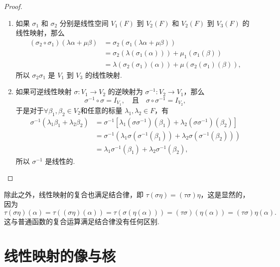 \begin{proof}
\begin{enumerate}
    \item 如果 $\sigma_1$ 和 $\sigma_2$ 分别是线性空间 $V_1(F)$ 到 $V_2(F)$ 和 $V_2(F)$ 到 $V_3(F)$ 的线性映射，那么
    \begin{align*}
        (\sigma_2 \circ \sigma_1)(\lambda \alpha  + \mu \beta) & = \sigma_2(\sigma_1(\lambda \alpha  + \mu \beta)) \\
        & = \sigma_2(\lambda (\sigma_1(\alpha))) + \mu_1(\sigma_1(\beta)) \\
        & = \lambda (\sigma_2(\sigma_1)(\alpha)) + \mu (\sigma_2(\sigma_1)(\beta)),
    \end{align*}
    所以 $\sigma_2\sigma_1$ 是 $V_1$ 到 $V_3$ 的线性映射.

    \item 如果可逆线性映射 $\sigma: V_1 \to V_2$ 的逆映射为 $\sigma^{-1}: V_2 \to V_1$，那么
    \[
    \sigma^{-1} \circ \sigma = I_{V_1}, \quad \text{且} \quad \sigma \circ \sigma^{-1} = I_{V_2},
    \]
    于是对于$ \forall \beta_1,\beta_2 \in V_2$和任意的标量 $\lambda_1, \lambda_2 \in F$，有
    \begin{align*}
        \sigma^{-1}(\lambda_1 \beta_1 + \lambda_2 \beta_2) & = \sigma^{-1}\left[ \lambda_1(\sigma \sigma^{-1})(\beta_1)+\lambda_2(\sigma \sigma^{-1})(\beta_2)\right] \\
        &= \sigma^{-1}(\lambda_1 \sigma(\sigma^{-1}(\beta_1)) + \lambda_2 \sigma(\sigma^{-1}(\beta_2))) \\
        & = \lambda_1 \sigma^{-1}(\beta_1) + \lambda_2 \sigma^{-1}(\beta_2),
    \end{align*}
    所以 $\sigma^{-1}$ 是线性的.
\end{enumerate}
\end{proof}

除此之外，线性映射的复合也满足结合律，即 $\tau(\sigma\eta) = (\tau\sigma)\eta$，这是显然的，因为
\[\tau(\sigma\eta)(\alpha) = \tau((\sigma\eta)(\alpha)) = \tau(\sigma(\eta(\alpha))) = (\tau\sigma)(\eta(\alpha)) = (\tau\sigma)\eta(\alpha).\]
这与普通函数的复合运算满足结合律没有任何区别.

\section{线性映射的像与核}


